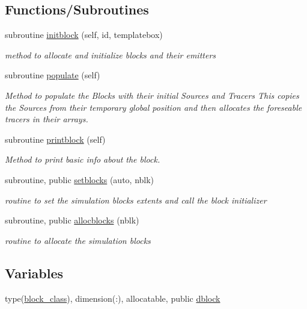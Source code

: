 \subsection*{Functions/\+Subroutines}
\begin{DoxyCompactItemize}
\item 
subroutine \hyperlink{namespaceblocks__mod_a534ca69b17b6f54ee07f995b02feff39}{initblock} (self, id, templatebox)
\begin{DoxyCompactList}\small\item\em method to allocate and initialize blocks and their emitters \end{DoxyCompactList}\item 
subroutine \hyperlink{namespaceblocks__mod_a7585844eb1b43604c04cb7a24c56205e}{populate} (self)
\begin{DoxyCompactList}\small\item\em Method to populate the Blocks with their initial Sources and Tracers This copies the Sources from their temporary global position and then allocates the foreseable tracers in their arrays. \end{DoxyCompactList}\item 
subroutine \hyperlink{namespaceblocks__mod_a6eab8b323cb15dcecb5c6b0c31b4e246}{printblock} (self)
\begin{DoxyCompactList}\small\item\em Method to print basic info about the block. \end{DoxyCompactList}\item 
subroutine, public \hyperlink{namespaceblocks__mod_a3312d23e0268d67aaf99d579aa57d0e7}{setblocks} (auto, nblk)
\begin{DoxyCompactList}\small\item\em routine to set the simulation blocks extents and call the block initializer \end{DoxyCompactList}\item 
subroutine, public \hyperlink{namespaceblocks__mod_a639beb0fee2290d46353f4b4702d6711}{allocblocks} (nblk)
\begin{DoxyCompactList}\small\item\em routine to allocate the simulation blocks \end{DoxyCompactList}\end{DoxyCompactItemize}
\subsection*{Variables}
\begin{DoxyCompactItemize}
\item 
type(\hyperlink{structblocks__mod_1_1block__class}{block\+\_\+class}), dimension(\+:), allocatable, public \hyperlink{namespaceblocks__mod_ac8ad6e3cf7a812f95dadb592336aca50}{dblock}
\end{DoxyCompactItemize}


